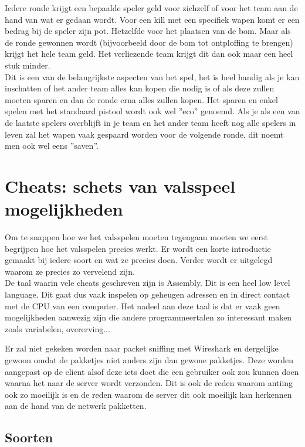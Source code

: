 \documentclass[pdftex,a4paper,12pt,twoside]{report}
\begin{document}
Iedere ronde krijgt een bepaalde speler geld voor zichzelf of voor het team aan de hand van wat er gedaan wordt. Voor een kill met een specifiek wapen komt er een bedrag bij de speler zijn pot. Hetzelfde voor het plaatsen van de bom. Maar als de ronde gewonnen wordt (bijvoorbeeld door de bom tot ontploffing te brengen) krijgt het hele team geld. Het verliezende team krijgt dit dan ook maar een heel stuk minder.
\\

Dit is een van de belangrijkste aspecten van het spel, het is heel handig als je kan inschatten of het ander team alles kan kopen die nodig is of als deze zullen moeten sparen en dan de ronde erna alles zullen kopen. Het sparen en enkel spelen met het standaard pistool wordt ook wel ''eco'' genoemd. Als je als een van de laatste spelers overblijft in je team en het ander team heeft nog alle spelers in leven zal het wapen vaak gespaard worden voor de volgende ronde, dit noemt men ook wel eens ''saven''.


\chapter{Cheats: schets van valsspeel mogelijkheden}
\label{ch:cheats}

Om te snappen hoe we het valsspelen moeten tegengaan moeten we eerst begrijpen hoe het valsspelen precies werkt. Er wordt een korte introductie gemaakt bij iedere soort en wat ze precies doen. Verder wordt er uitgelegd waarom ze precies zo vervelend zijn.
\\

De taal waarin vele \gls{cheat}s geschreven zijn is Assembly. Dit is een heel low level language. Dit gaat dus vaak inspelen op geheugen adressen en in direct contact met de CPU van een computer. Het nadeel aan deze taal is dat er vaak geen mogelijkheden aanwezig zijn die andere programmeertalen zo interessant maken zoals variabelen, overerving...
\citep{assembly}

Er zal niet gekeken worden naar packet sniffing met Wireshark en dergelijke gewoon omdat de pakketjes niet anders zijn dan gewone pakketjes. Deze worden aangepast op de client alsof deze iets doet die een gebruiker ook zou kunnen doen waarna het naar de server wordt verzonden. Dit is ook de reden waarom \gls{anti}ing ook zo moeilijk is en de reden waarom de server dit ook moeilijk kan herkennen aan de hand van de netwerk pakketten.

\section{Soorten}
\label{sec:soorten}
\end{document}
